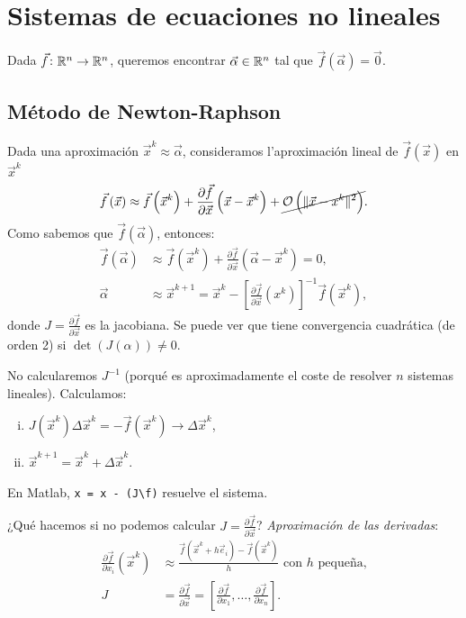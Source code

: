 \chapter{Sistemas de ecuaciones no lineales}

\noindent Dada $\vec{f} \colon \mathbb{R}^n \to \mathbb{R}^n$, queremos encontrar $\vec{\alpha} \in \mathbb{R}^n$ tal que $\vec{f}\left( \vec{\alpha} \right) = \vec{0}$.

\section{M\'etodo de Newton-Raphson}

\noindent Dada una aproximaci\'on $\vec{x}^k \approx \vec{\alpha}$, consideramos l'aproximaci\'on lineal de $\vec{f}\left( \vec{x} \right)$ en $\vec{x}^k$
\[
    \vec{f}\left( \vec{x} \right) \approx \vec{f}\left( \vec{x}^k \right) + \frac{\partial \vec{f}}{\partial \vec{x}}\left( \vec{x}-\vec{x}^k \right) + \cancel{\mathcal{O} \left( \| \vec{x}-x^k\|^2 \right)}.
\]
Como sabemos que $\vec{f} \left( \vec{\alpha} \right)$, entonces:
\begin{align*}
    \vec{f}\left( \vec{\alpha} \right) &\approx \vec{f}\left( \vec{x}^k \right) + \frac{\partial \vec{f}}{\partial \vec{x}}\left( \vec{\alpha}-\vec{x}^k \right) = 0, \\
    \vec{\alpha} &\approx \vec{x}^{k+1} = \vec{x}^k - \left[ \frac{\partial\vec{f}}{\partial\vec{x}}\left( x^k \right) \right]^{-1} \vec{f}\left( \vec{x}^k \right),
\end{align*}
donde $J = \frac{\partial\vec{f}}{\partial \vec{x}}$ es la jacobiana. Se puede ver que tiene convergencia cuadr\'atica (de orden 2) si $\det\left( J(\alpha) \right) \neq 0$.

\begin{obs}
    No calcularemos $J^{-1}$ (porqu\'e es aproximadamente el coste de resolver $n$ sistemas lineales). Calculamos:
    \begin{enumerate}[i)]
        \item $J\left( \vec{x}^k \right)\Delta \vec{x}^k = -\vec{f}\left( \vec{x}^k \right) \longrightarrow \Delta \vec{x}^k$,
        \item $\vec{x}^{k+1} = \vec{x}^k + \Delta\vec{x}^k$.
    \end{enumerate}
    En Matlab, \texttt{x = x - (J\textbackslash f)} resuelve el sistema.
\end{obs}

\noindent ¿Qu\'e hacemos si no podemos calcular $J = \frac{\partial \vec{f}}{\partial \vec{x}}$?
\emph{Aproximaci\'on de las derivadas}:
\begin{align*}
    \frac{\partial \vec{f}}{\partial x_i}\left( \vec{x}^k \right) &\approx \frac{\vec{f}\left( \vec{x}^k + h\vec{e}_i \right) - \vec{f}\left( \vec{x}^k \right)}{h} \text{ con } h \text{ pequeña,} \\
    J &= \frac{\partial \vec{f}}{\partial \vec{x}} = \left[ \frac{\partial \vec{f}}{\partial x_1}, \dots, \frac{\partial \vec{f}}{\partial x_n} \right].
\end{align*}

